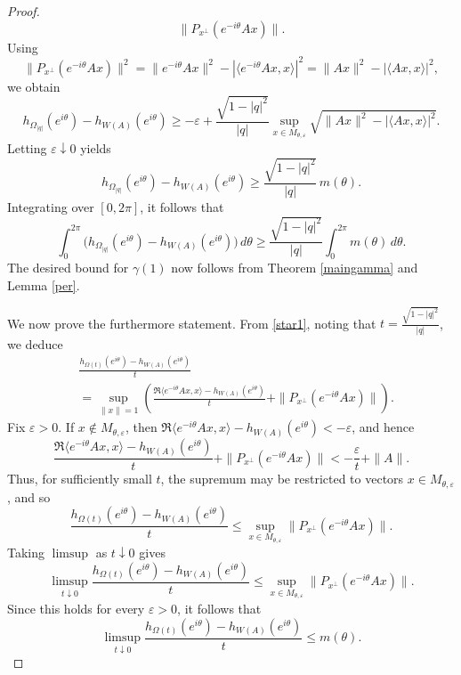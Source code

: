 \documentclass[10pt,a4paper]{amsart}
\begin{document}
\begin{proof}
\[\|P_{x^\perp}(e^{-i\theta}Ax)\|.
\]
Using
\[
\|P_{x^\perp}(e^{-i\theta}Ax)\|^2
=
\|e^{-i\theta}Ax\|^2-|\langle e^{-i\theta}Ax,x\rangle|^2
=
\|Ax\|^2-|\langle Ax,x\rangle|^2,
\]
we obtain
\[
h_{\Omega_{|q|}}(e^{i\theta})-h_{W(A)}(e^{i\theta})
\ge
-\varepsilon+
\frac{\sqrt{1-|q|^2}}{|q|}
\sup_{x\in M_{\theta,\varepsilon}}
\sqrt{\|Ax\|^2-|\langle Ax,x\rangle|^2}.
\]
Letting $\varepsilon\downarrow 0$ yields
\[
h_{\Omega_{|q|}}(e^{i\theta})-h_{W(A)}(e^{i\theta})
\ge
\frac{\sqrt{1-|q|^2}}{|q|}\,m(\theta).
\]
Integrating over $[0,2\pi]$, it follows that
\[
\int_0^{2\pi}
\bigl(h_{\Omega_{|q|}}(e^{i\theta})-h_{W(A)}(e^{i\theta})\bigr)\,d\theta
\ge
\frac{\sqrt{1-|q|^2}}{|q|}
\int_0^{2\pi} m(\theta)\,d\theta.
\]
The desired bound for $\gamma(1)$ now follows from Theorem \ref{maingamma} and Lemma \ref{per}.











We now prove the furthermore statement. From \eqref{star1}, noting that $
t=\frac{\sqrt{1-|q|^2}}{|q|}$, 
we deduce
\begin{align}
&\frac{h_{\Omega(t)}(e^{i\theta})-h_{W(A)}(e^{i\theta})}{t} \\
&=
\sup_{\|x\|=1}
\left(
\frac{\Re\langle e^{-i\theta}Ax,x\rangle-h_{W(A)}(e^{i\theta})}{t}
+
\|P_{x^\perp}(e^{-i\theta}Ax)\|
\right).
\end{align}
Fix $\varepsilon>0$. If $x\notin M_{\theta,\varepsilon}$, then $
\Re\langle e^{-i\theta}Ax,x\rangle-h_{W(A)}(e^{i\theta})<-\varepsilon$, 
and hence
\[
\frac{\Re\langle e^{-i\theta}Ax,x\rangle-h_{W(A)}(e^{i\theta})}{t}
+
\|P_{x^\perp}(e^{-i\theta}Ax)\|
<
-\frac{\varepsilon}{t}+\|A\|.
\]
Thus, for sufficiently small $t$, the supremum may be restricted to vectors
$x\in M_{\theta,\varepsilon}$, and so
\[
\frac{h_{\Omega(t)}(e^{i\theta})-h_{W(A)}(e^{i\theta})}{t}
\le
\sup_{x\in M_{\theta,\varepsilon}}
\|P_{x^\perp}(e^{-i\theta}Ax)\|.
\]
Taking $\limsup$ as $t\downarrow0$ gives
\[
\limsup_{t\downarrow0}
\frac{h_{\Omega(t)}(e^{i\theta})-h_{W(A)}(e^{i\theta})}{t}
\le
\sup_{x\in M_{\theta,\varepsilon}}
\|P_{x^\perp}(e^{-i\theta}Ax)\|.
\]
Since this holds for every $\varepsilon>0$, it follows that
\begin{equation}\label{eq1}
    \limsup_{t\downarrow0}
\frac{h_{\Omega(t)}(e^{i\theta})-h_{W(A)}(e^{i\theta})}{t}
\le
m(\theta).
\end{equation}


\end{proof}
\end{document}
